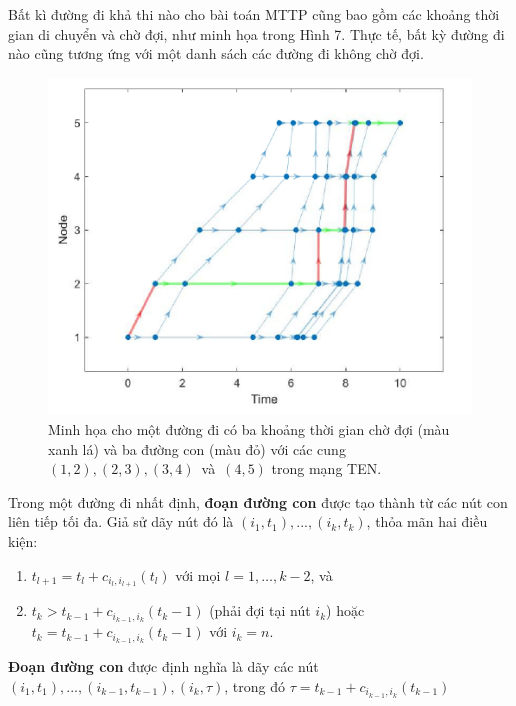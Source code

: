 \documentclass[../main.tex]{subfiles}
\begin{document}
Bất kì đường đi khả thi nào cho bài toán MTTP cũng bao gồm các khoảng
thời gian di chuyển và chờ đợi, như minh họa trong Hình 7. Thực tế, bất
kỳ đường đi nào cũng tương ứng với một danh sách các đường đi không chờ
đợi.

\begin{figure}[H]
\centering
\includegraphics{edited-images/Figure7.jpg}
\caption{Minh họa cho một đường đi có ba khoảng thời gian chờ đợi (màu xanh lá) và 
ba đường con (màu đỏ) với các cung \((1, 2), (2, 3), (3, 4)\)~và~\((4, 5)\) 
trong mạng TEN.}
\label{fig:7}
\end{figure}

\begin{definition}
\label{def:duong-di}
Trong một đường đi nhất định, \textbf{đoạn đường con} được tạo thành 
từ các nút con liên tiếp tối đa. Giả sử dãy nút đó
là \((i_1, t_1),...,(i_k, t_k)\), thỏa mãn hai điều kiện: 
\begin{enumerate}
  \item \(t_{l+1} =t_l + c_{i_l, i_{l+1}}(t_l)\) với mọi \(l = 1,\dots, k-2\), và
  \item \(t_k > t_{k-1} + c_{i_{k-1}, i_k}(t_k-1)\) (phải đợi tại nút
  \(i_k\)) hoặc \(t_k = t_{k-1} + c_{i_{k-1}, i_k}(t_k-1)\) với \(i_k=n\).
\end{enumerate}

\textbf{Đoạn đường con} được định nghĩa là dãy các nút
\((i_1, t_1),...,(i_{k-1}, t_{k-1}), (i_k, \tau)\), trong đó
\(\tau = t_{k−1} + c_{i_{k−1},i_k}(t_{k−1})\)
\end{definition}
\end{document}
